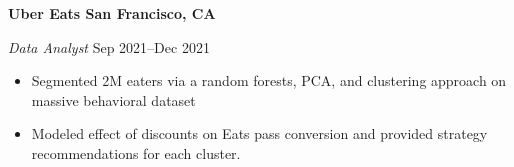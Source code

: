 \textbf{Uber Eats \hfill  San Francisco, CA} \par
\textit{Data Analyst} \hfill Sep 2021--Dec 2021 \par
\begin{itemize}
	\item Segmented 2M eaters via a random forests, PCA, and clustering approach on massive behavioral dataset
	\item Modeled effect of discounts on Eats pass conversion and provided strategy recommendations for each cluster.
\end{itemize} \par